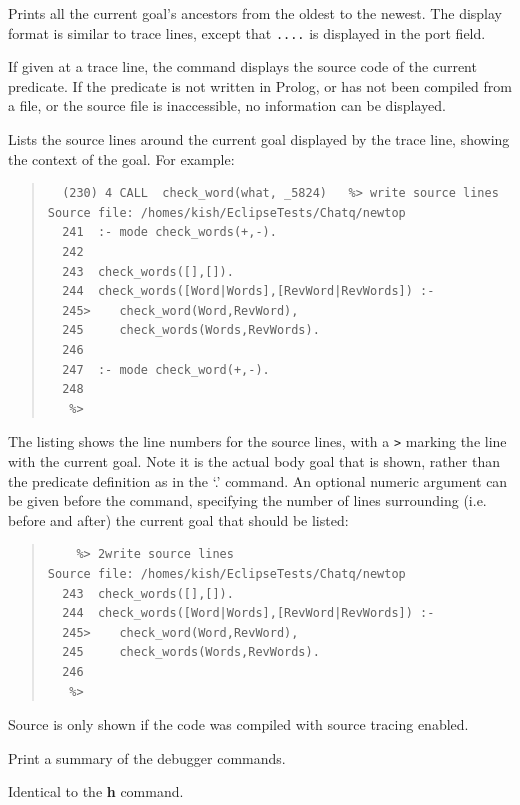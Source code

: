 \begin{descr}{1cm}

Prints all the current goal's ancestors from the oldest to the newest.
The display format is similar to trace lines,
except that {\tt ....} is displayed in the port field.

If given at a trace line, the command displays the source code of the
current predicate.
If the predicate is not written in Prolog, or has not been compiled from
a file, or the source file is inaccessible, no information can be displayed.

Lists the source lines around the current goal displayed by the trace line,
showing the context of the goal. For example:  

\begin{quote}\begin{verbatim}
  (230) 4 CALL  check_word(what, _5824)   %> write source lines
Source file: /homes/kish/EclipseTests/Chatq/newtop
  241  :- mode check_words(+,-).
  242  
  243  check_words([],[]).
  244  check_words([Word|Words],[RevWord|RevWords]) :-
  245>    check_word(Word,RevWord),
  245     check_words(Words,RevWords).
  246  
  247  :- mode check_word(+,-).
  248  
   %> 
\end{verbatim}\end{quote}

The listing shows the line numbers for the source lines, with a \verb'>'
marking the line with the current goal. Note it is the actual body goal
that is shown, rather than the predicate definition as in the `.' command.
An optional numeric argument can be given before the command, specifying
the number of lines surrounding (i.e. before and after) the current goal
that should be listed:

\begin{quote}\begin{verbatim}
    %> 2write source lines
Source file: /homes/kish/EclipseTests/Chatq/newtop
  243  check_words([],[]).
  244  check_words([Word|Words],[RevWord|RevWords]) :-
  245>    check_word(Word,RevWord),
  245     check_words(Words,RevWords).
  246  
   %> 
\end{verbatim}\end{quote}

Source is only shown if the code was compiled with source tracing enabled.

Print a summary of the debugger commands.

Identical to the {\bf h} command.

\end{descr}


